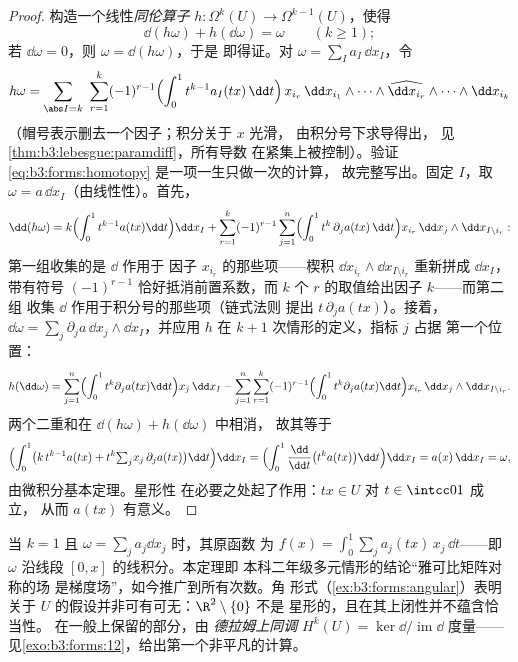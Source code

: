 \begin{proof}
构造一个线性\emph{同伦算子} $h\colon
\Omega^k(U) \to \Omega^{k-1}(U)$，使得
\begin{equation}\label{eq:b3:forms:homotopy}
\dd(h\omega) + h(\dd\omega) = \omega
\qquad (k \geq 1);
\end{equation}
若 $\dd\omega = 0$，则 $\omega = \dd(h\omega)$，于是
即得证。对 $\omega = \sum_I a_I\,\dd x_I$，令
\[
h\omega = \sum_{\abs I = k}\ \sum_{r=1}^{k}(-1)^{r-1}
\Bigl(\int_0^1 t^{k-1}a_I(tx)\,\dd t\Bigr)\,
x_{i_r}\,\dd x_{i_1}\wedge\dots\wedge
\widehat{\dd x_{i_r}}\wedge\dots\wedge\dd x_{i_k}
\]
（帽号表示删去一个因子；积分关于 $x$ 光滑，
由积分号下求导得出，
见\cref{thm:b3:lebesgue:paramdiff}，所有导数
在紧集上被控制）。验证
\eqref{eq:b3:forms:homotopy} 是一项一生只做一次的计算，
故完整写出。固定 $I$，取 $\omega =
a\,\dd x_I$（由线性性）。首先，
\[
\dd(h\omega) = k\Bigl(\int_0^1t^{k-1}a(tx)\dd t\Bigr)\dd x_I
+ \sum_{r=1}^k(-1)^{r-1}\sum_{j=1}^n
\Bigl(\int_0^1t^{k}\,\partial_ja(tx)\,\dd t\Bigr)
x_{i_r}\,\dd x_j\wedge\dd x_{I\setminus i_r} :
\]
第一组收集的是 $\dd$ 作用于
因子 $x_{i_r}$ 的那些项——楔积 $\dd x_{i_r}\wedge\dd
x_{I\setminus i_r}$ 重新拼成 $\dd x_I$，带有符号
$(-1)^{r-1}$ 恰好抵消前置系数，而 $k$ 个
$r$ 的取值给出因子 $k$——而第二组
收集 $\dd$ 作用于积分号的那些项（链式法则
提出 $t\,\partial_ja(tx)$）。接着，$\dd\omega =
\sum_j\partial_ja\,\dd x_j\wedge\dd x_I$，并应用
$h$ 在 $k+1$ 次情形的定义，指标 $j$ 占据
第一个位置：
\[
h(\dd\omega) = \sum_{j=1}^n\Bigl(\int_0^1t^{k}
\partial_ja(tx)\dd t\Bigr)x_j\,\dd x_I
- \sum_{j=1}^n\sum_{r=1}^k(-1)^{r-1}
\Bigl(\int_0^1t^{k}\partial_ja(tx)\dd t\Bigr)
x_{i_r}\,\dd x_j\wedge\dd x_{I\setminus i_r} .
\]
两个二重和在 $\dd(h\omega) + h(\dd\omega)$ 中相消，
故其等于
\[
\Bigl(\int_0^1\bigl(k\,t^{k-1}a(tx) +
t^k{\textstyle\sum_j}x_j\,\partial_ja(tx)\bigr)\dd t\Bigr)
\dd x_I
= \Bigl(\int_0^1\frac{\dd}{\dd t}\bigl(t^ka(tx)\bigr)\dd
t\Bigr)\dd x_I
= a(x)\,\dd x_I = \omega,
\]
由微积分基本定理。星形性
在必要之处起了作用：$tx \in U$ 对 $t \in \intcc01$ 成立，
从而 $a(tx)$ 有意义。
\end{proof}

\begin{remark}
当 $k = 1$ 且 $\omega = \sum_j a_j\dd x_j$ 时，其原函数
为 $f(x) = \int_0^1\sum_ja_j(tx)\,x_j\,\dd t$——即
$\omega$ 沿线段 $[0, x]$ 的线积分。本定理即
本科二年级多元情形的结论“雅可比矩阵对称的场
是梯度场”，如今推广到所有次数。角
形式（\cref{ex:b3:forms:angular}）表明关于
$U$ 的假设并非可有可无：$\R^2\setminus\{0\}$ 不是
星形的，且在其上闭性并不蕴含恰当性。
在一般上保留的部分，由
\emph{德拉姆上同调} $H^k(U) =
\ker\dd/\operatorname{im}\dd$ 度量——
见\cref{exo:b3:forms:12}，给出第一个非平凡的计算。
\end{remark}

